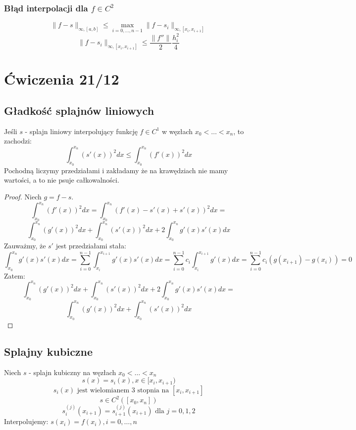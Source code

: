 \documentclass{article}
\begin{document}
\subsubsection{Błąd interpolacji dla $ f\in C^2 $}

$$\|f-s\|_{\infty,[a,b]} \le \max_{i=0,\dots,n-1}\|f-s_i\|_{\infty,[x_i, x_{i+1}]}
$$
$$\|f-s_i\|_{\infty,[x_i, x_{i+1}]} \le \frac{\|f''\|}{2}\frac{h_i^2}{4}$$

\section{Ćwiczenia 21/12}
\subsection{Gładkość splajnów liniowych}
Jeśli $ s $ - splajn liniowy interpolujący funkcję $ f\in C^1 $ w węzłach $ x_0<\dots< x_n $, to zachodzi:
$$\int_{x_0}^{x_n}(s'(x))^2dx\le \int_{x_0}^{x_n}(f'(x))^2dx$$
Pochodną liczymy przedziałami i zakładamy że na krawędziach nie mamy wartości, a to nie psuje całkowalności.
\begin{proof}
	Niech $ g=f-s $.
$$\int_{x_0}^{x_n}(f'(x))^2dx=\int_{x_0}^{x_n}(f'(x)-s'(x)+s'(x))^2dx=$$
$$\int_{x_0}^{x_n}(g'(x))^2dx+\int_{x_0}^{x_n}(s'(x))^2dx+2\int_{x_0}^{x_n}g'(x)s'(x)dx$$
Zauważmy, że $s'$ jest przedziałami stała:
$$\int_{x_0}^{x_n}g'(x)s'(x)dx=\sum_{i=0}^{n-1}\int_{x_i}^{x_{i+1}}g'(x)s'(x)dx=\sum_{i=0}^{n-1}c_i\int_{x_i}^{x_{i+1}}g'(x)dx=\sum_{i=0}^{n-1}c_i(g(x_{i+1}) - g(x_i))=0$$
Zatem:
$$\int_{x_0}^{x_n}(g'(x))^2dx+\int_{x_0}^{x_n}(s'(x))^2dx+2\int_{x_0}^{x_n}g'(x)s'(x)dx=$$
$$\int_{x_0}^{x_n}(g'(x))^2dx+\int_{x_0}^{x_n}(s'(x))^2dx$$
\end{proof}
\subsection{Splajny kubiczne}
Niech $ s $ - splajn kubiczny na węzłach $ x_0 < \dots< x_n $
$$s(x)=s_i(x), x\in [x_i, x_{i+1})$$
$$s_i(x) \text{ jest wielomianem 3 stopnia na } [x_i, x_{i+1}]$$
$$s\in C^2([x_0,x_n])$$
$$s_i^{(j)}(x_{i+1})=s_{i+1}^{(j)}(x_{i+1}) \text{ dla } j=0,1,2$$
Interpolujemy: 
$ s(x_i)=f(x_i), i=0,\dots,n $
\end{document}
